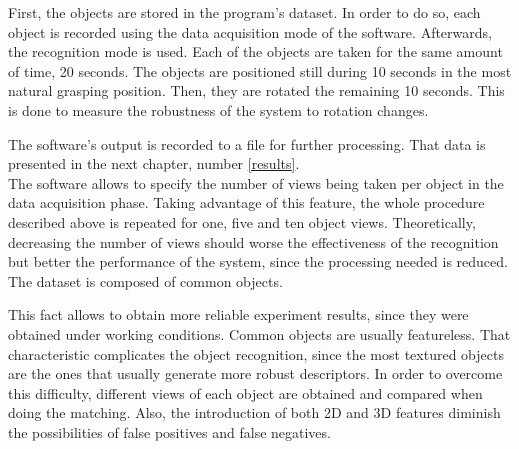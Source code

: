 
		First, the objects are stored in the program's dataset. 
		In order to do so, each object is recorded using the data acquisition mode of the software. 
		Afterwards, the recognition mode is used.
		Each of the objects are taken for the same amount of time, 20 seconds. 
		The objects are positioned still during 10 seconds in the most natural grasping position. 
		Then, they are rotated the remaining 10 seconds. 
		This is done to measure the robustness of the system to rotation changes. 

		The software's output is recorded to a file for further processing. 
		That data is presented in the next chapter, number \ref{results}.
		\\

		The software allows to specify the number of views being taken per object in the data acquisition phase. 
		Taking advantage of this feature, the whole procedure described above is repeated for one, five and ten object views.
		Theoretically, decreasing the number of views should worse the effectiveness of the recognition but better the performance of the system, since the processing needed is reduced.
		\\%

		The dataset is composed of common objects. 

		This fact allows to obtain more reliable experiment results, since they were obtained under working conditions. 
		Common objects are usually featureless. 
		That characteristic complicates the object recognition, since the most textured objects are the ones that usually generate more robust descriptors. 
		In order to overcome this difficulty, different views of each object are obtained and compared when doing the matching. 
		Also, the introduction of both 2D and 3D features diminish the possibilities of false positives and false negatives. 
		\\%

